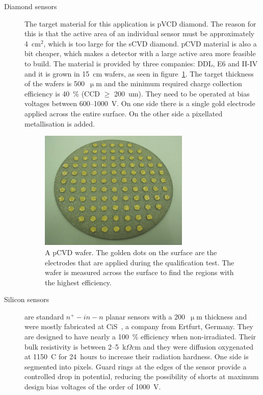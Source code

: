  
\begin{description}
\item[Diamond sensors] The target material for this application is pVCD diamond. The reason for this is that the active area of an individual sensor must be approximately 4~cm$^2$, which is too large for the sCVD diamond. pCVD material is also a bit cheaper, which makes a detector with a large active area more feasible to build. The material is provided by three companies: DDL, E6 and II-IV and it is grown in 15~cm wafers, as seen in figure~\ref{fig:wafer}. The target thickness of the wafers is 500~$\upmu$m and the minimum required charge collection efficiency is 40~\% (CCD $\geq$ 200~um). They need to be operated at bias voltages between 600--1000~V. On one side there is a single gold electrode applied across the entire surface. On the other side a pixellated metallisation is added. 
\begin{figure}[!t]
\centering
\includegraphics[width=0.7\textwidth]{04_charge_monitoring/pics/wafer}
\caption{A pCVD wafer. The golden dots on the surface are the electrodes that are applied during the qualification test. The wafer is measured across the surface to find the regions with the highest efficiency.}
\label{fig:wafer}
\end{figure}
\item[Silicon sensors] are standard $n^+ - in - n$ planar sensors with a 200~$\upmu$m thickness and were mostly fabricated at CiS~\cite{}, a company from Ertfurt, Germany. They are designed to have nearly a 100~\% efficiency when non-irradiated. Their bulk resistivity is between 2--5~k$\Omega$cm and they were diffusion oxygenated at 1150~\textdegree C for 24~hours to increase their radiation hardness. One side is segmented into pixels. Guard rings at the edges of the sensor provide a controlled drop in potential, reducing the possibility of shorts at maximum design bias voltages of the order of 1000~V.
\end{description}



